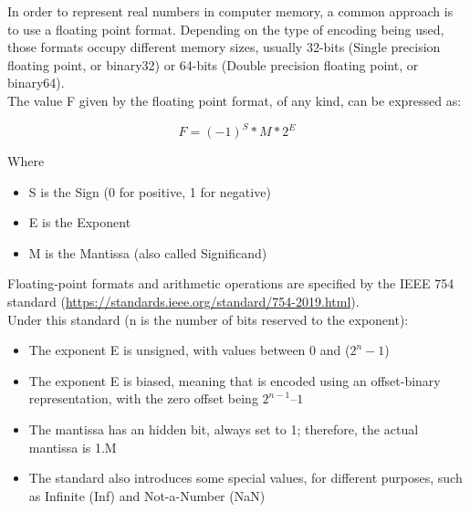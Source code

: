 In order to represent real numbers in computer memory, a common approach is to use a floating point format. Depending on the type of encoding being used, those formats occupy different memory sizes, usually 32-bits (Single precision floating point, or binary32) or 64-bits (Double precision floating point, or binary64). \\
The value F given by the floating point format, of any kind, can be expressed as:

$$F = (-1)^{S}*M*2^{E} $$

Where 
\begin{itemize}
	\item S is the Sign (0 for positive, 1 for negative)
	\item E is the Exponent
	\item M is the Mantissa (also called Significand)
\end{itemize}

Floating-point formats and arithmetic operations are specified by the IEEE 754 standard (\url{https://standards.ieee.org/standard/754-2019.html}). \\
Under this standard (n is the number of bits reserved to the exponent):
\begin{itemize}
	\item The exponent E is unsigned, with values between 0 and ($2^{n} -1$)
	\item	The exponent E is biased, meaning that is encoded using an offset-binary representation, with the zero offset being 			$2^{n-1} – 1$
	\item	The mantissa has an hidden bit, always set to 1; therefore, the actual mantissa is 1.M
	\item	The standard also introduces some special values, for different purposes, such as Infinite (Inf) and Not-a-Number (NaN)
\end{itemize}

